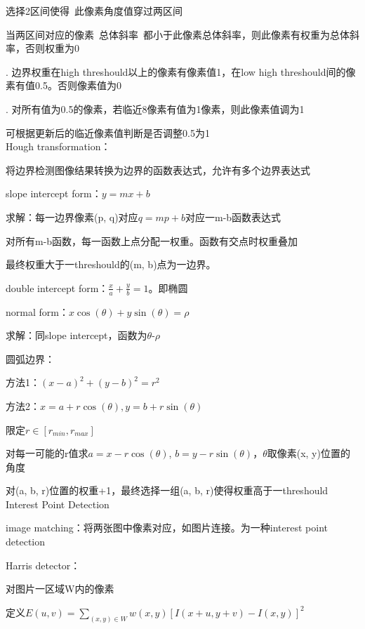 \documentclass[UTF8]{ctexart}
\begin{document}
  \quad \quad \quad 选择2区间使得\ 此像素角度值穿过两区间

  \quad \quad \quad 当两区间对应的像素\ 总体斜率\ 都小于此像素总体斜率，则此像素有权重为总体斜率，否则权重为0

  . 边界权重在high threshould以上的像素有像素值1，在low high threshould间的像素有值0.5。否则像素值为0

  . 对所有值为0.5的像素，若临近8像素有值为1像素，则此像素值调为1

  \quad \quad 可根据更新后的临近像素值判断是否调整0.5为1\\
Hough transformation：

  将边界检测图像结果转换为边界的函数表达式，允许有多个边界表达式

  \quad slope intercept form：$y = mx + b$

  \quad \quad 求解：每一边界像素(p, q)对应$q = mp + b$对应一m-b函数表达式

  \quad \quad \quad 对所有m-b函数，每一函数上点分配一权重。函数有交点时权重叠加
  
  \quad \quad \quad 最终权重大于一threshould的(m, b)点为一边界。

  \quad double intercept form：$\frac{x}{a} + \frac{y}{b} = 1$。即椭圆

  \quad normal form：$x\cos(\theta) + y\sin(\theta) = \rho$

  \quad \quad 求解：同slope intercept，函数为$\theta$-$\rho$

  \quad 圆弧边界：

  \quad \quad 方法1：$(x - a)^2 + (y - b)^2 = r^2$

  \quad \quad 方法2：$x = a + r\cos(\theta), y = b + r\sin(\theta)$
  
  \quad \quad \quad 限定$r \in [r_{min}, r_{max}]$

  \quad \quad \quad 对每一可能的r值求$a = x - r\cos(\theta)$, $b = y - r\sin(\theta)$，$\theta$取像素(x, y)位置的角度

  \quad \quad \quad 对(a, b, r)位置的权重+1，最终选择一组(a, b, r)使得权重高于一threshould\\
Interest Point Detection 

  image matching：将两张图中像素对应，如图片连接。为一种interest point detection 

  Harris detector：

  \quad 对图片一区域W内的像素

  \quad 定义$E(u, v) = \sum_{(x, y) \in W} w(x, y)[I(x + u, y + v) - I(x, y)]^2$
\end{document}
